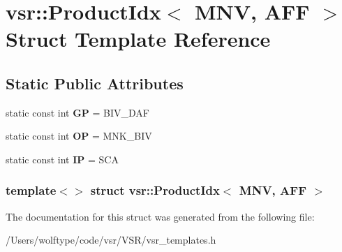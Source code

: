\hypertarget{structvsr_1_1_product_idx_3_01_m_n_v_00_01_a_f_f_01_4}{\section{vsr\-:\-:Product\-Idx$<$ M\-N\-V, A\-F\-F $>$ Struct Template Reference}
\label{structvsr_1_1_product_idx_3_01_m_n_v_00_01_a_f_f_01_4}
}
\subsection*{Static Public Attributes}
\begin{DoxyCompactItemize}
\item 
\hypertarget{structvsr_1_1_product_idx_3_01_m_n_v_00_01_a_f_f_01_4_a416fe660b39d087391bd443332e4b2ad}{static const int {\bfseries G\-P} = B\-I\-V\-\_\-\-D\-A\-F}\label{structvsr_1_1_product_idx_3_01_m_n_v_00_01_a_f_f_01_4_a416fe660b39d087391bd443332e4b2ad}

\item 
\hypertarget{structvsr_1_1_product_idx_3_01_m_n_v_00_01_a_f_f_01_4_a72bbda5c6d39d105008ce9e4a1a895c1}{static const int {\bfseries O\-P} = M\-N\-K\-\_\-\-B\-I\-V}\label{structvsr_1_1_product_idx_3_01_m_n_v_00_01_a_f_f_01_4_a72bbda5c6d39d105008ce9e4a1a895c1}

\item 
\hypertarget{structvsr_1_1_product_idx_3_01_m_n_v_00_01_a_f_f_01_4_a32d88cf33c3f8cb9386e2530fca17c0f}{static const int {\bfseries I\-P} = S\-C\-A}\label{structvsr_1_1_product_idx_3_01_m_n_v_00_01_a_f_f_01_4_a32d88cf33c3f8cb9386e2530fca17c0f}

\end{DoxyCompactItemize}
\subsubsection*{template$<$$>$ struct vsr\-::\-Product\-Idx$<$ M\-N\-V, A\-F\-F $>$}



The documentation for this struct was generated from the following file\-:\begin{DoxyCompactItemize}
\item 
/\-Users/wolftype/code/vsr/\-V\-S\-R/vsr\-\_\-templates.\-h\end{DoxyCompactItemize}
